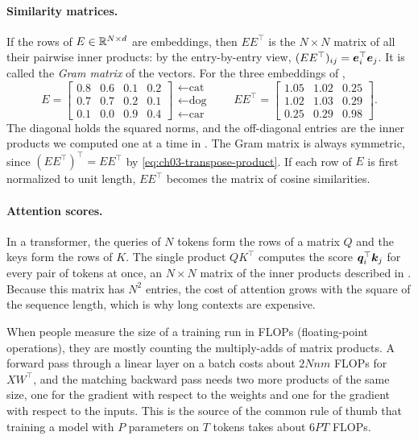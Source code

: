 \paragraph{Similarity matrices.}
If the rows of $E \in \mathbb{R}^{N \times d}$ are embeddings, then $EE^\top$ is the
$N \times N$ matrix of all their pairwise inner products: by the
entry-by-entry view, $(EE^\top)_{ij} = \bm{e}_i^\top \bm{e}_j$. It is
called the \emph{Gram matrix} of the vectors. For the three embeddings of
,
\[
  E = \begin{bmatrix}
    0.8 & 0.6 & 0.1 & 0.2 \\
    0.7 & 0.7 & 0.2 & 0.1 \\
    0.1 & 0.0 & 0.9 & 0.4
  \end{bmatrix}
  \begin{matrix}
    \leftarrow \text{cat} \\ \leftarrow \text{dog} \\ \leftarrow \text{car}
  \end{matrix}
  \qquad
  EE^\top = \begin{bmatrix}
    1.05 & 1.02 & 0.25 \\
    1.02 & 1.03 & 0.29 \\
    0.25 & 0.29 & 0.98
  \end{bmatrix}.
\]
The diagonal holds the squared norms, and the off-diagonal entries are the
inner products we computed one at a time in . The
Gram matrix is always symmetric, since
$(EE^\top)^\top = EE^\top$ by \cref{eq:ch03-transpose-product}. If each row
of $E$ is first normalized to unit length, $EE^\top$ becomes the matrix of
cosine similarities.

\paragraph{Attention scores.}
In a transformer, the queries of $N$ tokens form the rows of a matrix $Q$
and the keys form the rows of $K$. The single product $QK^\top$ computes
the score $\bm{q}_i^\top \bm{k}_j$ for every pair of tokens at once,
an $N \times N$ matrix of the inner products described in
. Because this matrix has $N^2$ entries, the cost
of attention grows with the square of the sequence length, which is why
long contexts are expensive.

\begin{aibox}
  When people measure the size of a training run in FLOPs (floating-point
  operations), they are mostly counting the multiply-adds of matrix
  products. A forward pass through a linear layer on a batch costs about
  $2Nnm$ FLOPs for $X W^\top$, and the matching backward pass needs two
  more products of the same size, one for the gradient with respect to the
  weights and one for the gradient with respect to the inputs. This is the
  source of the common rule of thumb that training a model with $P$
  parameters on $T$ tokens takes about $6PT$ FLOPs.
\end{aibox}

